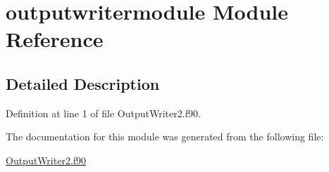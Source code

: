 \hypertarget{classoutputwritermodule}{\section{outputwritermodule Module Reference}
\label{classoutputwritermodule}
}


\subsection{Detailed Description}


Definition at line 1 of file Output\+Writer2.\+f90.



The documentation for this module was generated from the following file\+:\begin{DoxyCompactItemize}
\item 
\hyperlink{OutputWriter2_8f90}{Output\+Writer2.\+f90}\end{DoxyCompactItemize}
